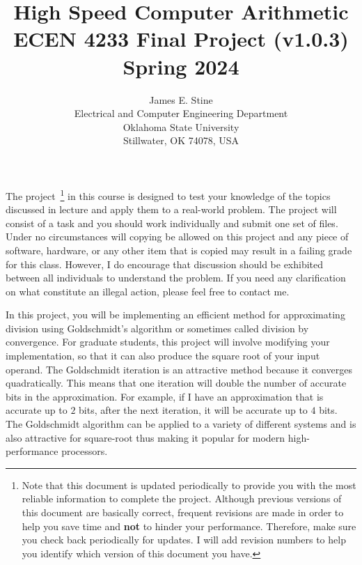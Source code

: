 \documentclass[times, 10pt, twocolumn]{IEEEtran}
\begin{document}
\title{High Speed Computer Arithmetic\\
ECEN 4233 Final Project (v1.0.3)\\
Spring 2024}
\author{James E. Stine\\
Electrical and Computer Engineering Department\\
Oklahoma State University\\
Stillwater, OK 74078, USA}
\date{}
\vskip 0.5cm

\maketitle

The project~\footnote{Note that this
document is updated periodically to provide you with the
most reliable information to complete the project.  Although
previous versions of this document are basically correct, frequent
revisions are made in order to help you save time and {\bf not}
to hinder your performance.  Therefore, make sure you
check back periodically for updates.  I will add revision
numbers to help you identify which version of this document
you have.}  in this course is designed to test your knowledge of the topics
discussed in lecture and apply them to a real-world problem.  The project
will consist of a task and you should work individually and submit one
set of files.  Under no circumstances will copying be allowed on this project and
any piece of software, hardware, or any other item that is copied may result
in a failing grade for this class.  However, I do encourage that discussion
should be exhibited between all individuals to understand the problem.  If you
need any clarification on what constitute an illegal action, please feel free
to contact me.

In this project, you will be implementing an efficient method for
approximating division using Goldschmidt's algorithm or
sometimes called division by convergence. For graduate students,
this project will involve modifying your implementation, so
that it can also produce the square root 
of your input operand.  The
Goldschmidt iteration is an attractive method because it converges
quadratically.  This means that one iteration will double the number
of accurate bits in the approximation.  For example, if I have an
approximation that is accurate up to $2$ bits, after the next
iteration, it will be accurate up to $4$ bits.  The Goldschmidt
algorithm can be applied to a variety of different systems and is
also attractive for square-root thus making it popular for modern
high-performance processors.
\end{document}
